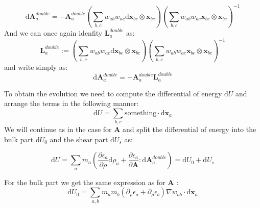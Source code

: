 \documentclass[oneside, a4paper, onecolumn, 11pt]{article}
\renewcommand{\AA}{\mathbf{A}}
\newcommand{\xx}{\mathbf{x}}
\newcommand{\diff}{\mathrm{d}}
\newcommand{\pd}{\partial}
\newcommand{\Ad}{\mathbf{A}^{double}}
\newcommand{\dxx}{\text{d}\mathbf{x}}
\newcommand{\Ld}{\mathbf{L}^{double}}
\begin{document}
\begin{section}
\begin{subsection}
\begin{subsubsection}
\begin{equation} \label{diffAd}
    \diff \Ad_{a} = - \Ad_{a} 
    \left( \sum_{b,c} w_{ab} w_{ac} \dxx_{bc} \otimes \xx_{bc} \right)
    \left( \sum_{b,c} w_{ab} w_{ac} \xx_{bc} \otimes \xx_{bc} \right)^{-1}
\end{equation}
And we can once again idenfity $\Ld_a$ as: 
\[
    \Ld_{a} := 
    \left( \sum_{b,c} w_{ab} w_{ac} \dxx_{bc} \otimes \xx_{bc} \right)
    \left( \sum_{b,c} w_{ab} w_{ac} \xx_{bc} \otimes \xx_{bc} \right)^{-1}
\] 
and write  simply as:
\[
\diff \Ad_a = -\Ad_a \Ld_a
\] 

To obtain the evolution we need to compute the differential of energy 
 $\diff U$ and arrange the terms in the following manner:
\[
    \diff U = \sum_{b,c} \text{something} \cdot \dxx_a
\] 
We will continue as in the case for $\AA$ and split the differential of
energy into the bulk part $\diff U_{0}$ and the shear part $\diff U_s$ as: 

\[
    \diff U = \sum_{a} m_{a} \left( \frac{\pd \epsilon_a}{\pd \rho} \diff \rho_a + 
    \frac{\pd \epsilon_a}{\pd \AA}: \diff \Ad_{a}\right) = \diff U_{0} + \diff U_{s}
\]

For the bulk part we get the same expression as for $\AA$ : 
\[
    \diff U_{0} = \sum_{a,b} m_{a} m_{b} \left( \pd_{\rho} \epsilon_{a} + \pd_{\rho} \epsilon_b \right) 
    \nabla w_{ab} \cdot \diff \xx_a
\]


\end{subsubsection}
\end{subsection}
\end{section}
\end{document}
